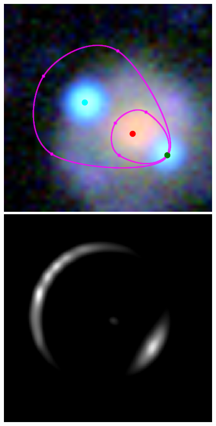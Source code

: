 \documentclass[usenatbib]{mn2e}
\newlength{\myplotswidth}
\begin{document}
\begin{figure}
  \centering
  \includegraphics[width=\myplotswidth]{fig/006941_input}
  \includegraphics[width=\myplotswidth]{fig/006941_arr_time_ipol} \\

\end{figure}
\end{document}
